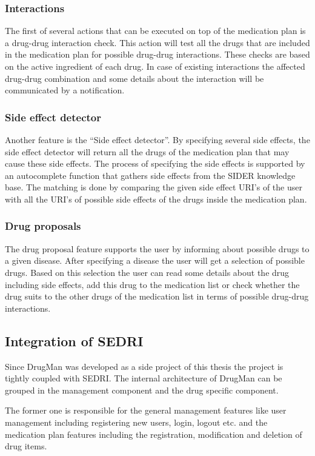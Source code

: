 \subsubsection*{Interactions}
The first of several actions that can be executed on top of the medication plan is a drug-drug interaction check.
This action will test all the drugs that are included in the medication plan for possible drug-drug interactions.
These checks are based on the active ingredient of each drug.
In case of existing interactions the affected drug-drug combination and some details about the interaction will be communicated by a notification.

\subsubsection*{Side effect detector}
Another feature is the ``Side effect detector''.
By specifying several side effects, the side effect detector will return all the drugs of the medication plan that may cause these side effects.
The process of specifying the side effects is supported by an autocomplete function that gathers side effects from the SIDER knowledge base.
The matching is done by comparing the given side effect URI's of the user with all the URI's of possible side effects of the drugs inside the medication plan.

\subsubsection*{Drug proposals}
The drug proposal feature supports the user by informing about possible drugs to a given disease.
After specifying a disease the user will get a selection of possible drugs.
Based on this selection the user can read some details about the drug including side effects, add this drug to the medication list or check whether the drug suits to the other drugs of the medication list in terms of possible drug-drug interactions.

\subsection{Integration of SEDRI}
\label{sec-2}
Since DrugMan was developed as a side project of this thesis the project is tightly coupled with SEDRI.
The internal architecture of DrugMan can be grouped in the management component and the drug specific component.

The former one is responsible for the general management features like user management including registering new users, login, logout etc. and the medication plan features including the registration, modification and deletion of drug items.

